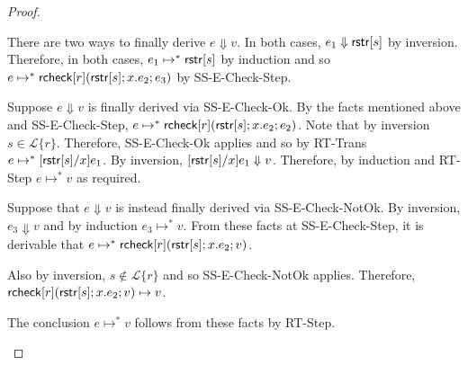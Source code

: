 \documentclass[12pt]{article}
\newtheorem{trthm}[tr]{TR Theorem}
\theoremstyle{definition}
\newcommand{\Lagr}{\mathcal{L}}
\newcommand{\lang}[1]{\Lagr\{#1\}}
\newcommand{\rcoerce}[2]{{\sf rcoerce}[#1](#2)}
\newcommand{\sistr}[1]{{\sf rstr}[#1]}   \newcommand{\rstr}[1]{{\sf rstr}[#1]} %
\newcommand{\val}{{\sf val}}
\newcommand{\rcheck}[4]{ {\sf rcheck}[#1](#2;#3;#4) }
\newcommand{\strin}[1]{\sistr{#1}}
\newcommand{\strcase}[3]{ {\sf rstrcase}(#1; #2; #3)}
\newcommand{\sreduces}{ \Downarrow }
\begin{document}
\begin{proof}
\begin{itemize}[label=$ $,itemsep=1ex]
There are two ways to finally derive $e \sreduces v$.
In both cases, $e_1 \sreduces \strin{s}$ by inversion.
Therefore, in both cases, $e_1 \mapsto^* \strin{s}$ by induction
and so $e \mapsto^* \rcheck{r}{\strin{s}}{x.e_2}{e_3}$ by SS-E-Check-Step.

Suppose $e \sreduces v$ is finally derived via SS-E-Check-Ok.
By the facts mentioned above and SS-E-Check-Step, $e \mapsto^* \rcheck{r}{\strin{s}}{x.e_2}{e_2}$.
Note that by inversion $s \in \lang{r}$. Therefore, SS-E-Check-Ok applies and so by RT-Trans $e \mapsto^* [\rstr{s}/x]e_1$.
By inversion, $[\strin{s}/x]e_1 \sreduces v$. Therefore, by induction and RT-Step $e \mapsto^* v$ as required.

Suppose that $e \sreduces v$ is instead finally derived via SS-E-Check-NotOk.
By inversion, $e_3 \sreduces v$ and by induction $e_3 \mapsto^* v$.
From these facts at SS-E-Check-Step, it is derivable that $e \mapsto^* \rcheck{r}{\strin{s}}{x.e_2}{v}$.

Also by inversion, $s \not \in \lang{r}$ and so SS-E-Check-NotOk applies.
Therefore, $\rcheck{r}{\strin{s}}{x.e_2}{v} \mapsto v$. 

The conclusion $e \mapsto^* v$ follows from these facts by RT-Step.
\end{itemize}
\end{proof}


%
\end{document}
